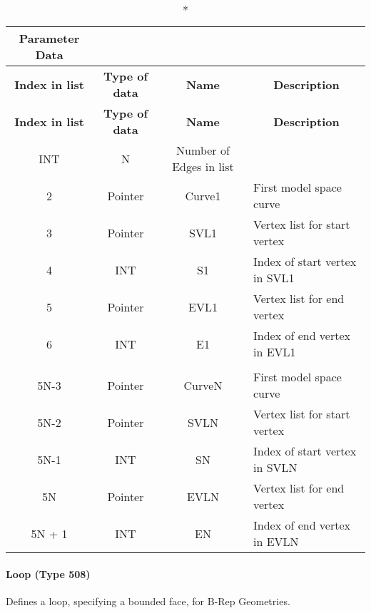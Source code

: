 \begin{longtable}[H]{|c|c|c|l|}
  \caption*{Parameter Data} \\

  \hline
  \multicolumn{1}{|c|}{\textbf{Index in list}} & \multicolumn{1}{|c|}{\textbf{Type of data}} &
  \multicolumn{1}{|c|}{\textbf{Name}} & \multicolumn{1}{|c|}{\textbf{Description}} \\ \hline
  \endfirsthead
  \hline
  
  \multicolumn{1}{|c|}{\textbf{Index in list}} & \multicolumn{1}{|c|}{\textbf{Type of data}} &
  \multicolumn{1}{|c|}{\textbf{Name}} & \multicolumn{1}{|c|}{\textbf{Description}} \\ \hline
  \endhead
  
  \endfoot

  \endlastfoot
1\textbar{}INT & N & Number of Edges in list\\ \hline
2 & Pointer & Curve1 & First model space curve\\ \hline
3 & Pointer & SVL1 & Vertex list for start vertex\\ \hline
4 & INT & S1 & Index of start vertex in SVL1\\ \hline
5 & Pointer & EVL1 & Vertex list for end vertex\\ \hline
6 & INT & E1 & Index of end vertex in EVL1\\ \hline
\vtop{\hbox{\strut .}\hbox{\strut .}} &
\vtop{\hbox{\strut .}\hbox{\strut .}} &
\vtop{\hbox{\strut .}\hbox{\strut .}} &\\ \hline
5N-3 & Pointer & CurveN & First model space curve\\ \hline
5N-2 & Pointer & SVLN & Vertex list for start vertex\\ \hline
5N-1 & INT & SN & Index of start vertex in SVLN\\ \hline
5N & Pointer & EVLN & Vertex list for end vertex\\ \hline
5N + 1 & INT & EN & Index of end vertex in EVLN\\ \hline
\end{longtable}

\paragraph{Loop (Type 508)}\label{loop-type-508}

Defines a loop, specifying a bounded face, for B-Rep Geometries.

